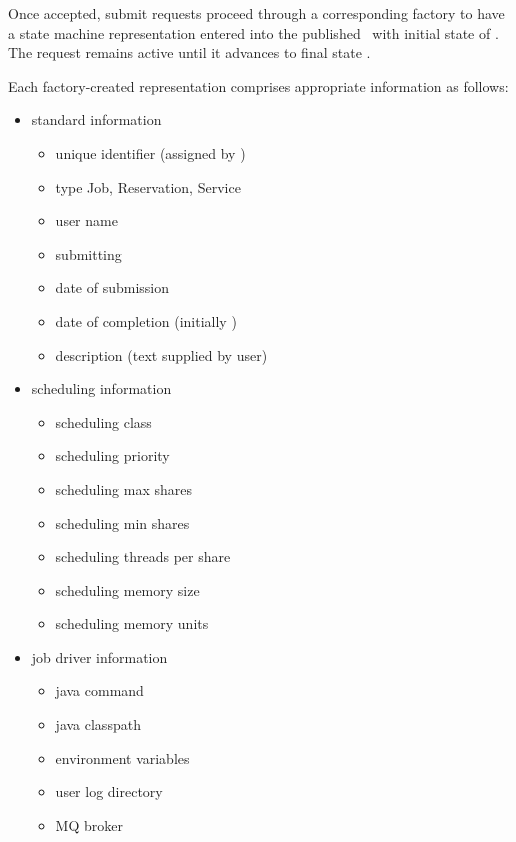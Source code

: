     Once accepted, submit requests proceed through a corresponding factory
    to have a state machine representation entered into the published
    \varORmap~with initial state of \varReceived.  The request remains 
    active until it advances to final state \varCompleted.
    
    Each factory-created representation comprises appropriate information as follows:
    
    \begin{itemize}
    
      \begin{itemize}
      \item standard information
        \begin{itemize}
          \item unique identifier (assigned by \varDUCC)
          \item type {Job, Reservation, Service}
          \item user name
          \item submitting \varPID
          \item date of submission
          \item date of completion (initially \varNull)
          \item description (text supplied by user)
        \end{itemize} 
      \item scheduling information
        \begin{itemize}
          \item scheduling class
          \item scheduling priority
          \item scheduling max shares
          \item scheduling min shares
          \item scheduling threads per share
          \item scheduling memory size
          \item scheduling memory units
        \end{itemize} 
      \item job driver information
        \begin{itemize}
          \item java command
          \item java classpath
          \item environment variables
          \item user log directory
          \item MQ broker

\end{itemize}
\end{itemize}
\end{itemize}
